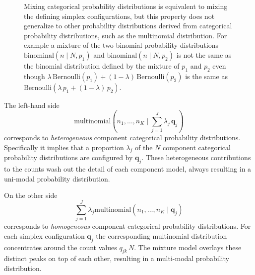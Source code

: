 \documentclass[
  letterpaper,
  DIV=11,
  numbers=noendperiod]{scrartcl}
\begin{document}
\begin{figure}


\caption{\label{fig-binomial}Mixing categorical probability
distributions is equivalent to mixing the defining simplex
configurations, but this property does not generalize to other
probability distributions derived from categorical probability
distributions, such as the multinomial distribution. For example a
mixture of the two binomial probability distributions
\(\mathrm{binominal}(n \mid N, p_{1})\) and
\(\mathrm{binominal}(n \mid N, p_{2})\) is not the same as the binomial
distribution defined by the mixture of \(p_{1}\) and \(p_{2}\) even
though
\(\lambda \, \mathrm{Bernoulli}(p_{1}) + (1 - \lambda) \, \mathrm{Bernoulli}(p_{2})\)
is the same as
\(\mathrm{Bernoulli}(\lambda \, p_{1} + (1 - \lambda) \, p_{2})\).}

\end{figure}%

The left-hand side \[
\mathrm{multinomial}( n_{1}, \ldots, n_{K} \mid
\textstyle \sum_{j = 1}^{J} \lambda_{j} \, \mathbf{q}_{j} )
\] corresponds to \emph{heterogeneous} component categorical probability
distributions. Specifically it implies that a proportion \(\lambda_{j}\)
of the \(N\) component categorical probability distributions are
configured by \(\mathbf{q}_{j}\). These heterogeneous contributions to
the counts wash out the detail of each component model, always resulting
in a uni-modal probability distribution.

On the other side \[
\sum_{j = 1}^{J} \lambda_{j}
\mathrm{multinomial}( n_{1}, \ldots, n_{K} \mid \mathbf{q}_{j})
\] corresponds to \emph{homogeneous} component categorical probability
distributions. For each simplex configuration \(\mathbf{q}_{j}\) the
corresponding multinomial distribution concentrates around the count
values \(q_{jk} \, N\). The mixture model overlays these distinct peaks
on top of each other, resulting in a multi-modal probability
distribution.
\end{document}
